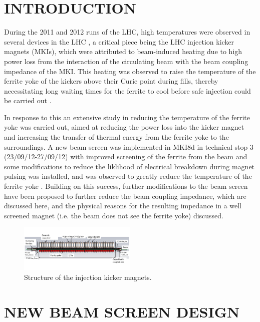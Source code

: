\documentclass{JAC2003}
\begin{document}
% 

\section{INTRODUCTION}

During the 2011 and 2012 runs of the LHC, high temperatures were observed in several devices in the LHC  \cite{metral_cham2012}, a critical piece being the LHC injection kicker magnets (MKIs), which were attributed to beam-induced heating due to high power loss from the interaction of the circulating beam with the beam coupling impedance of the MKI. This heating was observed to raise the temperature of the ferrite yoke of the kickers above their Curie point during fills, thereby necessitating long waiting times for the ferrite to cool before safe injection could be carried out \cite{mki-heating}. 

In response to this an extensive study in reducing the temperature of the ferrite yoke was carried out, aimed at reducing the power loss into the kicker magnet and increasing the transfer of thermal energy from the ferrite yoke to the surroundings. A new beam screen was implemented in MKI8d in technical stop 3 (23/09/12-27/09/12) with improved screening of the ferrite from the beam and some modifications to reduce the liklihood of electrical breakdown during magnet pulsing was installed, and was observed to greatly reduce the temperature of the ferrite yoke \cite{mki-heatingTemp}. Building on this success, further modifications to the beam screen have been proposed to further reduce the beam coupling impedance, which are discussed here, and the physical reasons for the resulting impedance in a well screened magnet (i.e. the beam does not see the ferrite yoke) discussed. 

\begin{figure}
\includegraphics[width=0.5\textwidth]{MKICrossSectionYZ.pdf}
\caption{Structure of the injection kicker magnets.}
\label{fig:mkiStruct}
\end{figure}

\section{NEW BEAM SCREEN DESIGN}
\end{document}
